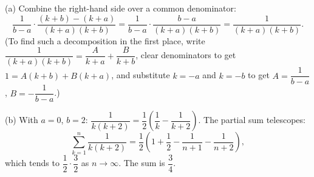 (a) Combine the right-hand side over a common denominator:
\[
\dfrac{1}{b-a}\cdot\dfrac{(k+b)-(k+a)}{(k+a)(k+b)}=\dfrac{1}{b-a}\cdot\dfrac{b-a}{(k+a)(k+b)}=\dfrac{1}{(k+a)(k+b)}.
\]
(To find such a decomposition in the first place, write \(\dfrac{1}{(k+a)(k+b)}=\dfrac{A}{k+a}+\dfrac{B}{k+b}\), clear denominators to get \(1=A(k+b)+B(k+a)\), and substitute \(k=-a\) and \(k=-b\) to get \(A=\dfrac{1}{b-a}\), \(B=-\dfrac{1}{b-a}\).)

(b) With \(a=0\), \(b=2\): \(\dfrac{1}{k(k+2)}=\dfrac{1}{2}\left(\dfrac{1}{k}-\dfrac{1}{k+2}\right)\). The partial sum telescopes:
\[
\sum_{k=1}^{n}\dfrac{1}{k(k+2)}=\dfrac{1}{2}\left(1+\dfrac{1}{2}-\dfrac{1}{n+1}-\dfrac{1}{n+2}\right),
\]
which tends to \(\dfrac{1}{2}\cdot\dfrac{3}{2}\) as \(n\to\infty\). The sum is \(\boxed{\dfrac{3}{4}}\).
